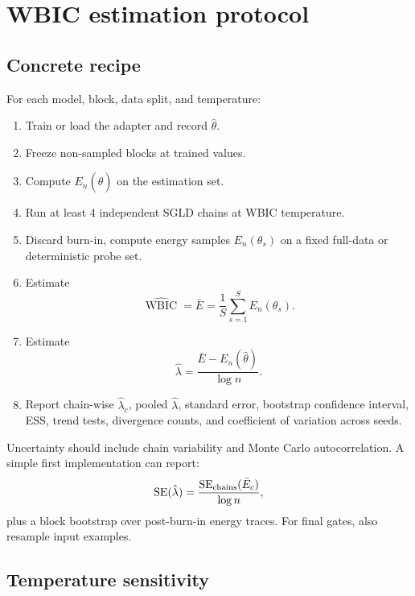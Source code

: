 \documentclass[11pt]{article}
\begin{document}
\section{WBIC estimation protocol}

\subsection{Concrete recipe}

For each model, block, data split, and temperature:
\begin{enumerate}[(1)]
\item Train or load the adapter and record $\hat\theta$.
\item Freeze non-sampled blocks at trained values.
\item Compute $E_n(\hat\theta)$ on the estimation set.
\item Run at least 4 independent SGLD chains at WBIC temperature.
\item Discard burn-in, compute energy samples $E_n(\theta_s)$ on a fixed full-data or deterministic probe set.
\item Estimate
\begin{equation}
  \widehat{\operatorname{WBIC}} = \bar E = \frac{1}{S}\sum_{s=1}^S E_n(\theta_s).
\end{equation}
\item Estimate
\begin{equation}
  \hat\lambda = \frac{\bar E - E_n(\hat\theta)}{\log n}.
\end{equation}
\item Report chain-wise $\hat\lambda_c$, pooled $\hat\lambda$, standard error, bootstrap confidence interval, ESS, trend tests, divergence counts, and coefficient of variation across seeds.
\end{enumerate}

Uncertainty should include chain variability and Monte Carlo autocorrelation.  A simple first implementation can report:
\begin{equation}
  \operatorname{SE}(\hat\lambda)
  = \frac{\operatorname{SE}_{\rm chains}(\bar E_c)}{\log n},
\end{equation}
plus a block bootstrap over post-burn-in energy traces.  For final gates, also resample input examples.

\subsection{Temperature sensitivity}
\end{document}
